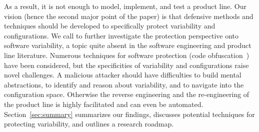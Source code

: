 As a result, it is not enough to model, implement, and test a product line. 
Our vision (hence the second major point of the paper) is that defensive methods and techniques should be developed to specifically protect variability and configurations. %
 We call to further investigate the protection perspective onto software variability, a topic quite absent in the software engineering and product line literature. Numerous techniques for software protection (\eg code obfuscation~\cite{collberg1997taxonomy}) have been considered, but the specificities of variability and configurations raise novel challenges. 
 A malicious attacker should have difficulties to build mental abstractions, to identify and reason about variability, and to navigate into the configuration space. Otherwise the reverse engineering and the re-engineering of the product line is highly facilitated and can even be automated. 
Section~\ref{sec:summary} summarizes our findings, discusses potential techniques for protecting variability, and outlines a research roadmap. 
% 
 
 




 





